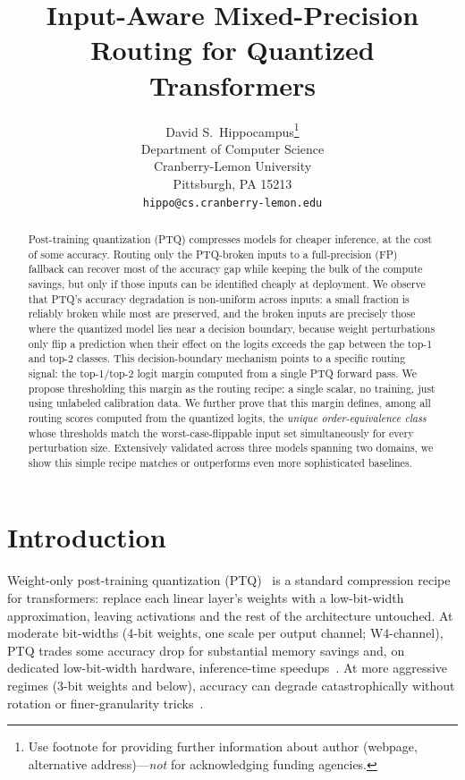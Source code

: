 \documentclass{article}
\title{Input-Aware Mixed-Precision Routing for Quantized Transformers}
\author{%
  David S.~Hippocampus\thanks{Use footnote for providing further information
    about author (webpage, alternative address)---\emph{not} for acknowledging
    funding agencies.} \\
  Department of Computer Science\\
  Cranberry-Lemon University\\
  Pittsburgh, PA 15213 \\
  \texttt{hippo@cs.cranberry-lemon.edu} \\
}
\newcommand{\fp}{\textsc{FP}\xspace}
\newcommand{\ptq}{\textsc{PTQ}\xspace}
\begin{document}
\maketitle


\begin{abstract}
  Post-training quantization (\ptq) compresses models for cheaper inference, at the cost of some accuracy. Routing only the \ptq-broken inputs to a full-precision (\fp) fallback can recover most of the accuracy gap while keeping the bulk of the compute savings, but only if those inputs can be identified cheaply at deployment. We observe that \ptq's accuracy degradation is non-uniform across inputs: a small fraction is reliably broken while most are preserved, and the broken inputs are precisely those where the quantized model lies near a decision boundary, because weight perturbations only flip a prediction when their effect on the logits exceeds the gap between the top-1 and top-2 classes. This decision-boundary mechanism points to a specific routing signal: the top-1/top-2 logit margin computed from a single \ptq{} forward pass. We propose thresholding this margin as the routing recipe: a single scalar, no training, just using unlabeled calibration data. We further prove that this margin defines, among all routing scores computed from the quantized logits, the \emph{unique order-equivalence class} whose thresholds match the worst-case-flippable input set simultaneously for every perturbation size. Extensively validated across three models spanning two domains, we show this simple recipe matches or outperforms even more sophisticated baselines.
\end{abstract}

\section{Introduction}
\label{sec:intro}

Weight-only post-training quantization (\ptq)~\cite{gholami2022survey} is a standard compression recipe for transformers: replace each linear layer's weights with a low-bit-width approximation, leaving activations and the rest of the architecture untouched.
At moderate bit-widths (4-bit weights, one scale per output channel; W4-channel), \ptq trades some accuracy drop for substantial memory savings and, on dedicated low-bit-width hardware, inference-time speedups~\cite{frantar2023gptq,lin2024awq,jacob2018quantization,gholami2022survey}.
At more aggressive regimes (3-bit weights and below), accuracy can degrade catastrophically without rotation or finer-granularity tricks~\cite{ashkboos2024quarot,liu2024spinquant}.
\end{document}
